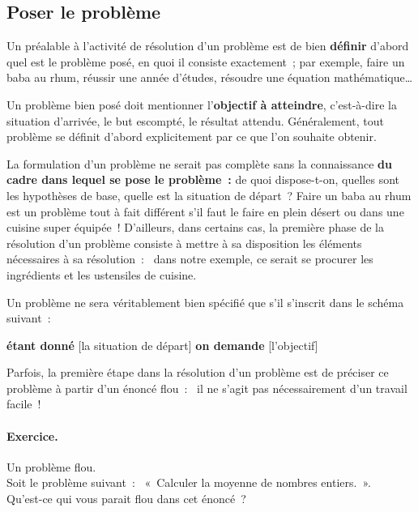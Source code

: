 		\subsection{Poser le problème}
		
			Un préalable à l’activité de résolution d’un problème 
			est de bien \textbf{définir} d’abord 
			quel est le problème posé, 
			en quoi il consiste exactement~; 
			par exemple, faire un baba au rhum, 
			réussir une année d’études, 
			résoudre une équation mathématique\dots
			
			Un problème bien posé doit mentionner 
			l’\textbf{objectif à atteindre},
			c’est-à-dire la situation d’arrivée, 
			le but escompté, le résultat attendu. 
			Généralement, tout problème se définit d’abord explicitement
			par ce que l’on souhaite obtenir.
			
			La formulation d’un problème ne serait pas complète 
			sans la connaissance
			\textbf{du cadre dans lequel se pose le problème~:}
			de quoi dispose-t-on, quelles sont les hypothèses de base, 
			quelle est la situation de départ~? 
			Faire un baba au rhum est un problème tout à fait différent 
			s’il faut le faire en plein désert 
			ou dans une cuisine super équipée~! 
			D’ailleurs, dans certains cas, 
			la première phase de la résolution d’un problème 
			consiste à mettre à sa disposition 
			les éléments nécessaires à sa résolution~:~
			dans notre exemple, 
			ce serait se procurer les ingrédients 
			et les ustensiles de cuisine.
		
			Un problème ne sera véritablement bien spécifié 
			que s’il s’inscrit dans le schéma suivant~:
			
			\begin{center}
			\begin{Ovalbox}
				{\textbf{étant donné} [la situation de départ] 
				\textbf{on demande} [l’objectif]}
			\end{Ovalbox}
			\end{center}
		
			Parfois, la première étape dans la résolution d’un problème 
			est de préciser ce problème à partir d’un énoncé flou~:~
			il ne s’agit pas nécessairement d’un travail facile~!
	
			\begin{Emphase}
				\paragraph{Exercice.} Un problème flou.\\
				Soit le problème suivant~:~
				«~Calculer la moyenne de nombres entiers.~».
				\\Qu’est-ce qui vous parait flou dans cet énoncé~?
			\end{Emphase}
			

